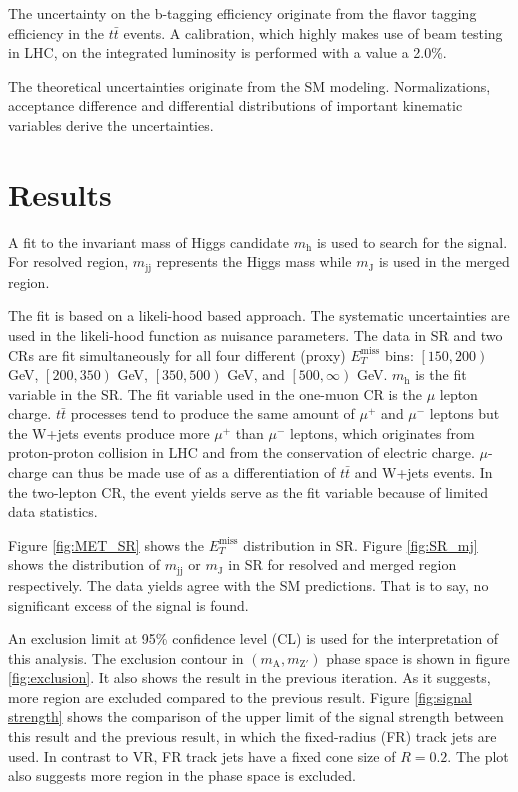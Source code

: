 \documentclass[class=NCU_thesis, crop=false]{standalone}
\begin{document}
	The uncertainty on the b-tagging efficiency originate from the flavor tagging efficiency in the $t\bar{t}$ events. A calibration, which highly makes use of beam testing in LHC, on the integrated luminosity is performed with a value a 2.0\%.
	
	The theoretical uncertainties originate from the SM modeling. Normalizations, acceptance difference and differential distributions of important kinematic variables derive the uncertainties.
	
\section{Results}
	A fit to the invariant mass of Higgs candidate $m_{\mathrm{h}}$ is used to search for the signal. For resolved region, $m_{\mathrm{jj}}$ represents the Higgs mass while $m_{\mathrm{J}}$ is used in the merged region.
	
	The fit is based on a likeli-hood based approach. The systematic uncertainties are used in the likeli-hood function as nuisance parameters. The data in SR and two CRs are fit simultaneously for all four different (proxy) $E_T^{\mathrm{miss}}$ bins: $\left[150, 200\right)$ GeV, $\left[200, 350\right)$ GeV, $\left[350, 500\right)$ GeV, and $\left[500, \infty \right)$ GeV. $m_{\mathrm{h}}$ is the fit variable in the SR. The fit variable used in the one-muon CR is the $\mu$ lepton charge. $t\bar{t}$ processes tend to produce the same amount of $\mu^+$ and $\mu^-$ leptons but the W+jets events produce more $\mu^+$ than $\mu^-$ leptons, which originates from proton-proton collision in LHC and from the conservation of electric charge. $\mu$-charge can thus be made use of as a differentiation of $t\bar{t}$ and W+jets events. In the two-lepton CR, the event yields serve as the fit variable because of limited data statistics.
	
	Figure \ref{fig:MET_SR} shows the $E_T^{\mathrm{miss}}$ distribution in SR. Figure \ref{fig:SR_mj} shows the distribution of $m_{\mathrm{jj}}$ or $m_{\mathrm{J}}$ in SR for resolved and merged region respectively. The data yields agree with the SM predictions. That is to say, no significant excess of the signal is found.
	
	An exclusion limit at 95\% confidence level (CL) is used for the interpretation of this analysis. The exclusion contour in $(m_{\mathrm{A}}, m_{\mathrm{Z'}})$ phase space is shown in figure \ref{fig:exclusion}. It also shows the result in the previous iteration. As it suggests, more region are excluded compared to the previous result. Figure \ref{fig:signal strength} shows the comparison of the upper limit of the signal strength between this result and the previous result, in which the fixed-radius (FR) track jets are used. In contrast to VR, FR track jets have a fixed cone size of $R = 0.2$. The plot also suggests more region in the phase space is excluded.
	
\end{document}
